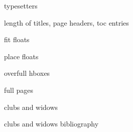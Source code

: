 typesetters

length of titles, page headers, toc entries

fit floats

place floats

overfull hboxes

full pages

clubs and widows

clubs and widows bibliography

